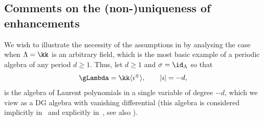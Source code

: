 \documentclass[a4paper]{amsart}
\begin{document}
\subsection{Comments on the (non-)uniqueness of enhancements}
\label{sec:comms_non_uniqueness}

We wish to illustrate the necessity of the assumptions in
 by analysing the case when
$\Lambda=\kk$ is an arbitrary field, which is the most basic example of a
periodic algebra of any period $d\geq 1$. Thus, let $d\geq 1$ and $\sigma=\id_\Lambda$ so that
\[
  \gLambda=\kk\langle\imath^\pm\rangle,\qquad |\imath|=-d,
\]
is the algebra of Laurent polynomials in a single variable of degree $-d$, which
we view as a DG algebra with vanishing differential (this algebra is considered
implicitly in~\cite[Ex.~3.30]{Lad16} and explicitly in~\cite[Ex.~6.7]{Lor22},
see also ).
\end{document}
